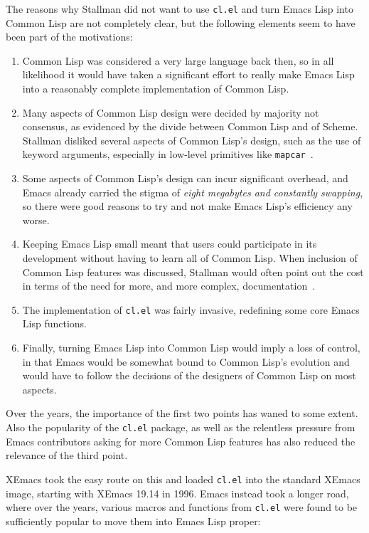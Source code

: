 \documentclass[format=acmsmall, review]{acmart}
\newcommand \Elisp {Emacs Lisp}
\begin{document}
The reasons why Stallman did not want to use \texttt{cl.el} and turn \Elisp{}
into Common Lisp are not completely clear, but the following elements seem
to have been part of the motivations:
\begin{enumerate}
\item Common Lisp was considered a very large language back then, so in all
  likelihood it would have taken a significant effort to really make
  \Elisp{} into a reasonably complete implementation of Common Lisp.
\item Many aspects of Common Lisp design were decided by majority not consensus, as
  evidenced by the divide between Common Lisp and of Scheme.
  Stallman disliked several aspects of Common Lisp's design, such as the use of
  keyword arguments, especially in low-level primitives like
  \texttt{mapcar}~\cite{RMS-keyword-args-are-clunky}.
\item Some aspects of Common Lisp's design can incur 
  significant overhead, and Emacs already carried the stigma of \emph{eight megabytes and
    constantly swapping}, so there were good reasons to try and not make
  \Elisp{}'s efficiency any worse.
\item Keeping \Elisp{} small meant that users could participate in its
  development without having to learn all of Common Lisp.  When inclusion of
  Common Lisp features was discussed, Stallman would often point out the cost
  in terms of the need for more, and more complex,
  documentation~\cite{RMS-cl-big-doc}.
\item The implementation of \texttt{cl.el} was fairly invasive, redefining
  some core \Elisp{} functions.
\item Finally, turning \Elisp{} into Common Lisp would imply a loss of control,
  in that Emacs would be somewhat bound to Common Lisp's evolution and would
  have to follow the decisions of the designers of Common Lisp on most aspects.
\end{enumerate}
Over the years, the importance of the first two points has waned to some
extent.  Also the popularity of the \texttt{cl.el} package, as well as the
relentless pressure from Emacs contributors asking for more Common Lisp
features has also reduced the relevance of the third point.

XEmacs took the easy route on this and loaded \texttt{cl.el} into the
standard XEmacs image, starting with XEmacs 19.14 in 1996.  Emacs instead
took a longer road, where over the years, various macros and functions from
\texttt{cl.el} were found to be sufficiently popular to move them into
\Elisp{} proper:
\end{document}
